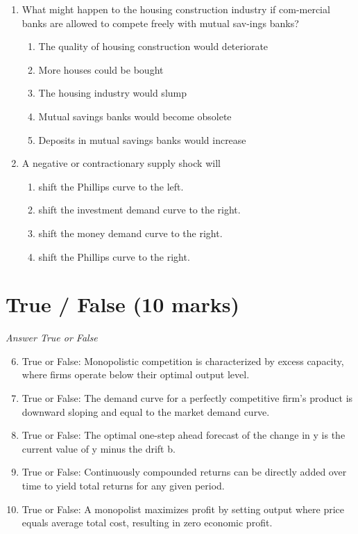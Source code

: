 \documentclass[12pt]{article}
\begin{document}
\begin{enumerate}[label=\arabic*.]
\begin{enumerate}[label=(\alph*)]
\end{enumerate}
\item What might happen to the housing construction industry if com-mercial banks are allowed to compete freely with mutual sav-ings banks?
\begin{enumerate}[label=(\alph*)]
    \item The quality of housing construction would deteriorate
    \item More houses could be bought
    \item The housing industry would slump
    \item Mutual savings banks would become obsolete
    \item Deposits in mutual savings banks would increase
\end{enumerate}
\item A negative or contractionary supply shock will
\begin{enumerate}[label=(\alph*)]
    \item shift the Phillips curve to the left.
    \item shift the investment demand curve to the right.
    \item shift the money demand curve to the right.
    \item shift the Phillips curve to the right.
\end{enumerate}
\end{enumerate}

\section*{True / False (10 marks)}
\textit{Answer True or False}
\begin{enumerate}[label=\arabic*.]
\setcounter{enumi}{5}
\item True or False: Monopolistic competition is characterized by excess capacity, where firms operate below their optimal output level.
\item True or False: The demand curve for a perfectly competitive firm's product is downward sloping and equal to the market demand curve.
\item True or False: The optimal one-step ahead forecast of the change in y is the current value of y minus the drift b.
\item True or False: Continuously compounded returns can be directly added over time to yield total returns for any given period.
\item True or False: A monopolist maximizes profit by setting output where price equals average total cost, resulting in zero economic profit.
\end{enumerate}
\end{document}
